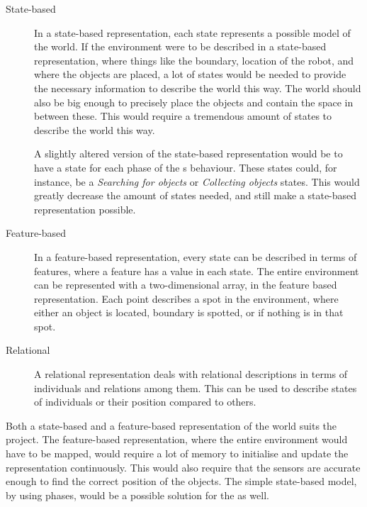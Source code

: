 \begin{description}
\item[State-based] In a state-based representation, each state represents a possible model of the world. If the environment were to be described in a state-based representation, where things like the boundary, location of the robot, and where the objects are placed, a lot of states would be needed to provide the necessary information to describe the world this way. The world should also be big enough to precisely place the objects and contain the space in between these. This would require a tremendous amount of states to describe the world this way. 

A slightly altered version of the state-based representation would be to have a state for each phase of the \projname{}s behaviour. These states could, for instance, be a \emph{Searching for objects} or \emph{Collecting objects} states. This would greatly decrease the amount of states needed, and still make a state-based representation possible. 

\item[Feature-based] In a feature-based representation, every state can be described in terms of features, where a feature has a value in each state. The entire environment can be represented with a two-dimensional array, in the feature based representation. Each point describes a spot in the environment, where either an object is located, boundary is spotted, or if nothing is in that spot. 

\item[Relational] A relational representation deals with relational descriptions in terms of individuals and relations among them. This can be used to describe states of individuals or their position compared to others. 
\end{description}

Both a state-based and a feature-based representation of the world suits the project. The feature-based representation, where the entire environment would have to be mapped, would require a lot of memory to initialise and update the representation continuously. This would also require that the sensors are accurate enough to find the correct position of the objects. The simple state-based model, by using phases, would be a possible solution for the \projname{} as well. 






